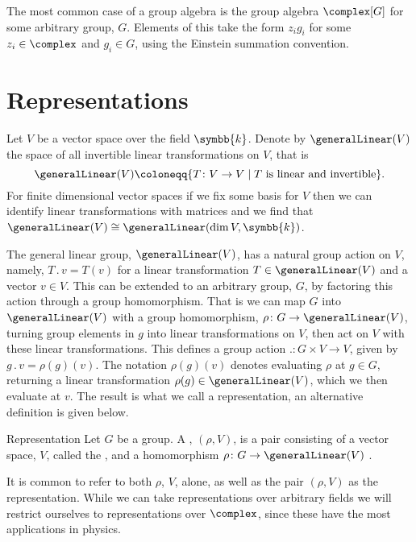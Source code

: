 \documentclass[fleqn]{NotesClass}
\renewcommand{\field}{\symbb{k}}
\newcommand{\action}{\mathbin{.}}
\newcommand{\isomorphic}{\cong}
\begin{document}
    The most common case of a group algebra is the group algebra \(\complex[G]\) for some arbitrary group, \(G\).
    Elements of this take the form \(z_i g_i\) for some \(z_i \in \complex\) and \(g_i \in G\), using the Einstein summation convention.
    
    \section{Representations}%
    Let \(V\) be a vector space over the field \(\field\).
    Denote by \(\generalLinear(V)\) the space of all invertible linear transformations on \(V\), that is
    \begin{equation}
        \generalLinear(V) \coloneqq \{T \colon V \to V \mid T \text{ is linear and invertible}\}.
    \end{equation}
    For finite dimensional vector spaces if we fix some basis for \(V\) then we can identify linear transformations with matrices and we find that \(\generalLinear(V) \isomorphic \generalLinear(\dim V, \field)\).
    
    The general linear group, \(\generalLinear(V)\), has a natural group action on \(V\), namely, \(T \action v = T(v)\) for a linear transformation \(T \in \generalLinear(V)\) and a vector \(v \in V\).
    This can be extended to an arbitrary group, \(G\), by factoring this action through a group homomorphism.
    That is we can map \(G\) into \(\generalLinear(V)\) with a group homomorphism, \(\rho \colon G \to \generalLinear(V)\), turning group elements in \(g\) into linear transformations on \(V\), then act on \(V\) with these linear transformations.
    This defines a group action \(\action \colon G \times V \to V\), given by \(g \action v = \rho(g)(v)\).
    The notation \(\rho(g)(v)\) denotes evaluating \(\rho\) at \(g \in G\), returning a linear transformation \(\rho(g) \in \generalLinear(V)\), which we then evaluate at \(v\).
    The result is what we call a representation, an alternative definition is given below.
    
    \begin{dfn}{Representation}{}
        Let \(G\) be a group.
        A , \((\rho, V)\), is a pair consisting of a vector space, \(V\), called the , and a homomorphism \(\rho \colon G \to \generalLinear(V)\) \cite[726]{hassani}.
    \end{dfn}
    
    It is common to refer to both \(\rho\), \(V\), alone, as well as the pair \((\rho, V)\) as the representation.
    While we can take representations over arbitrary fields we will restrict ourselves to representations over \(\complex\), since these have the most applications in physics.
    
\end{document}
